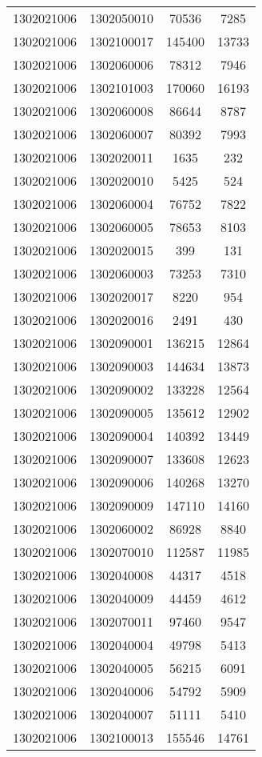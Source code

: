 \begin{longtable}{llcc}
1302021006 & 1302050010 & 70536 & 7285\\
1302021006 & 1302100017 & 145400 & 13733\\
1302021006 & 1302060006 & 78312 & 7946\\
1302021006 & 1302101003 & 170060 & 16193\\
1302021006 & 1302060008 & 86644 & 8787\\
1302021006 & 1302060007 & 80392 & 7993\\
1302021006 & 1302020011 & 1635 & 232\\
1302021006 & 1302020010 & 5425 & 524\\
1302021006 & 1302060004 & 76752 & 7822\\
1302021006 & 1302060005 & 78653 & 8103\\
1302021006 & 1302020015 & 399 & 131\\
1302021006 & 1302060003 & 73253 & 7310\\
1302021006 & 1302020017 & 8220 & 954\\
1302021006 & 1302020016 & 2491 & 430\\
1302021006 & 1302090001 & 136215 & 12864\\
1302021006 & 1302090003 & 144634 & 13873\\
1302021006 & 1302090002 & 133228 & 12564\\
1302021006 & 1302090005 & 135612 & 12902\\
1302021006 & 1302090004 & 140392 & 13449\\
1302021006 & 1302090007 & 133608 & 12623\\
1302021006 & 1302090006 & 140268 & 13270\\
1302021006 & 1302090009 & 147110 & 14160\\
1302021006 & 1302060002 & 86928 & 8840\\
1302021006 & 1302070010 & 112587 & 11985\\
1302021006 & 1302040008 & 44317 & 4518\\
1302021006 & 1302040009 & 44459 & 4612\\
1302021006 & 1302070011 & 97460 & 9547\\
1302021006 & 1302040004 & 49798 & 5413\\
1302021006 & 1302040005 & 56215 & 6091\\
1302021006 & 1302040006 & 54792 & 5909\\
1302021006 & 1302040007 & 51111 & 5410\\
1302021006 & 1302100013 & 155546 & 14761\\

\end{longtable}
